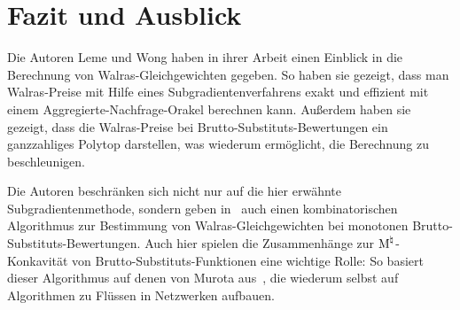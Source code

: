 \section{Fazit und Ausblick}

Die Autoren Leme und Wong haben in ihrer Arbeit einen Einblick in die Berechnung von Walras-Gleichgewichten gegeben.
So haben sie gezeigt, dass man Walras-Preise mit Hilfe eines Subgradientenverfahrens exakt und effizient mit einem Aggregierte-Nachfrage-Orakel berechnen kann.
Außerdem haben sie gezeigt, dass die Walras-Preise bei Brutto-Substituts-Bewertungen ein ganzzahliges Polytop darstellen, was wiederum ermöglicht, die Berechnung zu beschleunigen.

Die Autoren beschränken sich nicht nur auf die hier erwähnte Subgradientenmethode, sondern geben in~\cite[Abschnitt~7]{PaesLeme2018} auch einen kombinatorischen Algorithmus zur Bestimmung von Walras-Gleichgewichten bei monotonen
 Brutto-Substituts-Bewertungen.
 Auch hier spielen die Zusammenhänge zur $\textrm{\textup{M}}^\natural$-Konkavität von Brutto-Substituts-Funktionen eine wichtige Rolle: So basiert dieser Algorithmus auf denen von Murota aus~\cite[Abschnitt~10.4]{Murota2003}, die wiederum selbst auf Algorithmen zu Flüssen in Netzwerken aufbauen.